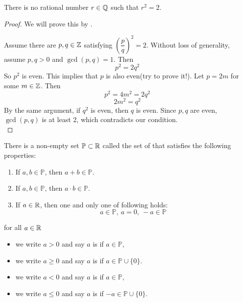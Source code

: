 \documentclass[a4paper,12pt]{article}
\begin{document}
\begin{theorem} There is no rational number \(r\in\mathbb{Q}\) such that \(r^2=2\).
    \begin{proof}
        We will prove this by . 
        
        Assume there are \(p,q\in\mathbb{Z}\) satisfying \((\dfrac{p }{q })^2=2\). Without loss of generality, assume \(p,q>0\) and \(\gcd(p,q)=1\). Then 
        \[p^2=2q^2\]
        So \(p^2\) is even. This implies that \(p\) is also even(try to prove it!). Let \(p=2m\) for some \(m\in\mathbb{Z}\). Then 
        \[p^2=4m^2=2q^2\]
        \[2m^2=q^2\]
        By the same argument, if \(q^2\) is even, then \(q\) is even.
        Since \(p,q\) are even, \(\gcd(p,q)\) is at least 2, which contradicts our condition.\\
    \end{proof}
\end{theorem}

\newpage
\begin{axiom} There is a non-empty set \(\mathbb{P}\subset\mathbb{R}\) called the set of   that satisfies the following properties:
    
    \begin{enumerate}
        \item If \(a,b\in\mathbb{P}\), then \(a+b\in\mathbb{P}\).
        \item If \(a,b\in\mathbb{P}\), then \(a\cdot b\in\mathbb{P}\).
        \item If \(a\in\mathbb{R}\), then one and only one of following holds:
        \[a\in\mathbb{P},\ a=0,\ -a\in\mathbb{P}\]
    \end{enumerate}
     for all \(a\in\mathbb{R}\)
    \begin{itemize}
        \item we write \(a>0\) and say \(a\) is  if \(a\in\mathbb{P}\), 
        \item we write \(a\ge 0\) and say \(a\) is  if \(a\in\mathbb{P}\cup\{0\}\).
        \item we write \(a<0\) and say \(a\) is  if \(a\in\mathbb{P}\), 
        \item we write \(a\le 0\) and say \(a\) is  if \(-a\in\mathbb{P}\cup \{0\}\).\\
    \end{itemize}
    
\end{axiom}
\end{document}
